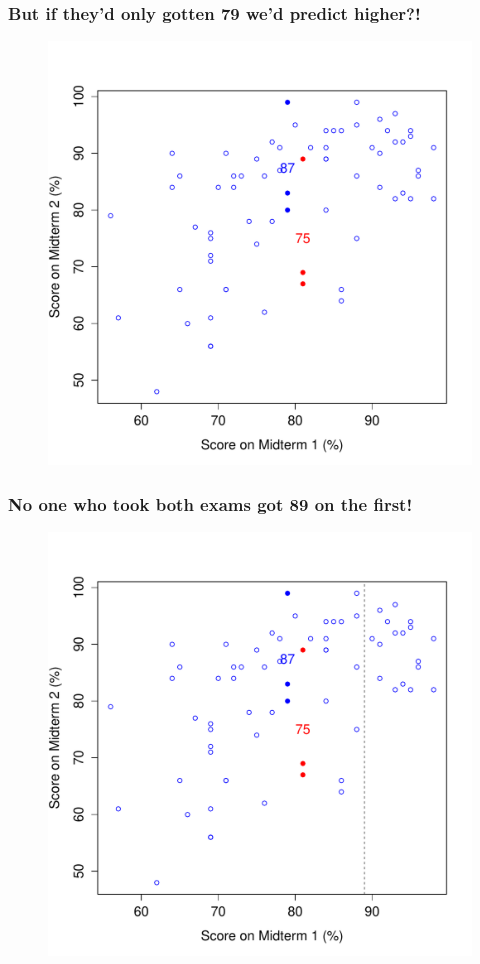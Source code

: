 \documentclass[handout]{beamer}
\begin{document}
\begin{frame}
\frametitle{But if they'd only gotten 79 we'd predict higher?!}
\begin{figure}
	\includegraphics[scale = 0.48]{./images/midterms3}
\end{figure}
\end{frame}
\begin{frame}
\frametitle{No one who took both exams got 89 on the first!}
\begin{figure}
	\includegraphics[scale = 0.48]{./images/midterms4}
\end{figure}
\end{frame}
\end{document}
